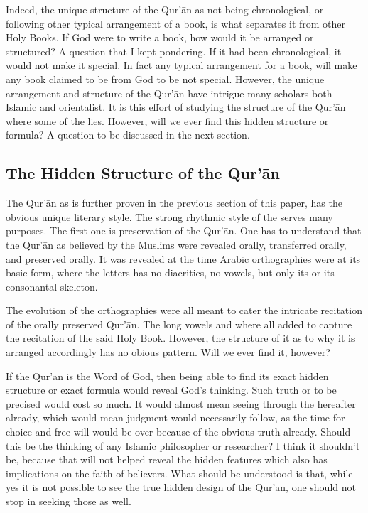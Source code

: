Indeed, the unique structure of the Qur'\=an as not being chronological, or following other typical arrangement of a book, is what separates it from other Holy Books. If God were to write a book, how would it be arranged or structured? A question that I kept pondering. If it had been chronological, it would not make it special. In fact any typical arrangement for a book, will make any book claimed to be from God to be not special. However, the unique arrangement and structure of the Qur'\=an have intrigue many scholars both Islamic and orientalist. It is this effort of studying the structure of the Qur'\=an where some of the   lies. However, will we ever find this hidden structure or formula? A question to be discussed in the next section.

\subsection{The Hidden Structure of the Qur'\=an}
The Qur'\=an as is further proven in the previous section of this paper, has the obvious unique literary style. The strong rhythmic style of the   serves many purposes. The first one is preservation of the Qur'\=an. One has to understand that the Qur'\=an as believed by the Muslims were revealed orally, transferred orally, and preserved orally. It was revealed at the time Arabic orthographies were at its basic form, where the letters has no diacritics, no vowels, but only its   or its consonantal skeleton. 

The evolution of the orthographies were all meant to cater the intricate recitation of the orally preserved Qur'\=an. The long vowels and   where all added to capture the recitation of the said Holy Book. However, the structure of it as to why it is arranged accordingly has no obious pattern. Will we ever find it, however?

If the Qur'\=an is the Word of God, then being able to find its exact hidden structure or exact formula would reveal God's thinking. Such truth or   to be precised would cost so much. It would almost mean seeing through the hereafter already, which would mean judgment would necessarily follow, as the time for choice and free will would be over because of the obvious truth already. Should this be the thinking of any Islamic philosopher or researcher? I think it shouldn't be, because that will not helped reveal the hidden features which also has implications on the faith of believers. What should be understood is that, while yes it is not possible to see the true hidden design of the Qur'\=an, one should not stop in seeking those as well.

